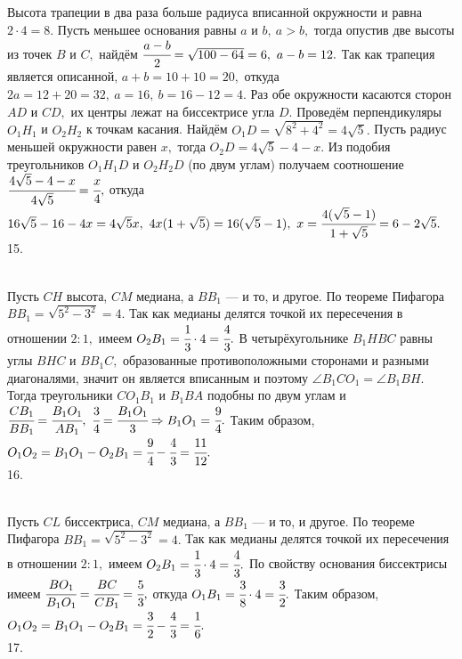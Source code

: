 Высота трапеции в два раза больше радиуса вписанной окружности и равна $2\cdot4=8.$ Пусть меньшее основания равны $a$ и $b,\ a>b,$ тогда опустив две высоты из точек $B$ и $C,$ найдём $\cfrac{a-b}{2}=\sqrt{100-64}=6,\ a-b=12.$ Так как трапеция является описанной, $a+b=10+10=20,$ откуда $2a=12+20=32,\ a=16,\ b=16-12=4.$ Раз обе окружности касаются сторон $AD$ и $CD,$ их центры лежат на биссектрисе угла $D.$ Проведём перпендикуляры $O_1H_1$ и $O_2H_2$ к точкам касания. Найдём $O_1D=\sqrt{8^2+4^2}=4\sqrt{5}.$ Пусть радиус меньшей окружности равен $x,$ тогда  $O_2D=4\sqrt{5}-4-x.$ Из подобия треугольников $O_1H_1D$ и $O_2H_2D$ (по двум углам) получаем соотношение $\cfrac{4\sqrt{5}-4-x }{4\sqrt{5}}=\cfrac{x}{4},$ откуда $16\sqrt{5}-16-4x=4\sqrt{5}x,\ 4x(1+\sqrt{5})=16(\sqrt{5}-1),\ x=\cfrac{4(\sqrt{5}-1)}{1+\sqrt{5}}=6-2\sqrt{5}.$\\
15. \begin{figure}[ht!]
\end{figure}\\
Пусть $CH$ высота, $CM$ медиана, а $BB_1$ --- и то, и другое. По теореме Пифагора $BB_1=\sqrt{5^2-3^2}=4.$ Так как медианы делятся точкой их пересечения в отношении $2:1,$ имеем $O_2B_1=\cfrac{1}{3}\cdot4=\cfrac{4}{3}.$ В четырёхугольнике $B_1HBC$ равны углы $BHC$ и $BB_1C,$ образованные противоположными сторонами и разными диагоналями, значит он является вписанным и поэтому $\angle B_1CO_1=\angle B_1BH.$ Тогда треугольники $CO_1B_1$ и $B_1BA$ подобны по двум углам и  $\cfrac{CB_1}{BB_1}=\cfrac{B_1O_1}{AB_1},\ \cfrac{3}{4}=\cfrac{B_1O_1}{3}\Rightarrow B_1O_1=\cfrac{9}{4}.$ Таким образом, $O_1O_2=B_1O_1-O_2B_1=\cfrac{9}{4}-\cfrac{4}{3}=\cfrac{11}{12}.$\\
16. \begin{figure}[ht!]
\end{figure}\\
Пусть $CL$ биссектриса, $CM$ медиана, а $BB_1$ --- и то, и другое. По теореме Пифагора $BB_1=\sqrt{5^2-3^2}=4.$ Так как медианы делятся точкой их пересечения в отношении $2:1,$ имеем $O_2B_1=\cfrac{1}{3}\cdot4=\cfrac{4}{3}.$ По свойству основания биссектрисы имеем $\cfrac{BO_1}{B_1O_1}=\cfrac{BC}{CB_1}=\cfrac{5}{3},$ откуда $O_1B_1=\cfrac{3}{8}\cdot4=\cfrac{3}{2}.$ Таким образом, $O_1O_2=B_1O_1-O_2B_1=\cfrac{3}{2}-\cfrac{4}{3}=\cfrac{1}{6}.$\\
17. \begin{figure}[ht!]
\end{figure}\\
